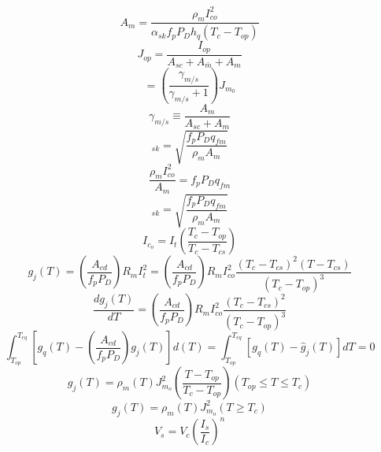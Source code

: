 \begin{equation}%
A_m=\frac {\rho_mI_{co}^2}{\alpha_{sk}f_pP_Dh_q(T_c-T_{op})}
\end{equation}
\begin{equation}%
J_{op}=\frac{I_{op}}{A_{sc}+A_ {\bar{m}}+A_m}
\end{equation}
\begin{equation}%
=(\frac{\gamma_{m/s}}{\gamma_{m/s}+1})J_{m_0}
\end{equation}
\begin{equation}%
\gamma_{m/s}\equiv \frac{A_m}{A_{sc}+A_m}
\end{equation}
\begin{equation}%
[J_{m_o}]_{sk}=\sqrt{\frac{f_pP_Dq_{fm}}{\rho_mA_m}}
\end{equation}
\begin{equation}%
\frac {\rho_mI_{co}^2}{A_m}=f_pP_Dq_{fm}
\end{equation}
\begin{equation}%
[J_{m_o}]_{sk}=\sqrt{\frac{f_pP_Dq_{fm}}{\rho_mA_m}}
\end{equation}
\begin{equation}%
I_{c_o}=I_t(\frac{T_c-T_{op} }{T_c-T_{cs}})
\end{equation}
\begin{equation}%
g_j(T)=(\frac{A_{cd}}{f_pP_D})R_mI_t^2=(\frac{A_{cd}}{f_pP_D})R_mI_{co}^2\frac{(T_c-T_{cs})^2(T-T_{cs})}{(T_c-T_{op})^3}
\end{equation}
\begin{equation}%
\frac{dg_j(T)}{dT}=(\frac{A_{cd}}{f_pP_D})R_mI_{co}^2\frac{(T_c-T_{cs})^2}{(T_c-T_{op})^3}
\end{equation}
\begin{equation}%
\int_{T_{op}}^{T_{eq}}[g_q(T)-(\frac{A_{cd}}{f_pP_D})g_j(T)]d(T)
=\int_{T_{op}}^{T_{eq}}[g_q(T)-\hat{g}_j(T)]dT=0
\end{equation}
\begin{equation}%
g_j(T)=\rho_m(T)J_{m_o}^2(\frac{T-T_{op}}{T_c-T_{op}}) (T_{op}\leq T \leq T_c)
\end{equation}
\begin{equation}%
g_j(T)=\rho_m(T)J_{m_o}^2 (T \geq T_c)
\end{equation}
\begin{equation}%
V_s=V_c(\frac{I_s}{I_c})^n
\end{equation}
